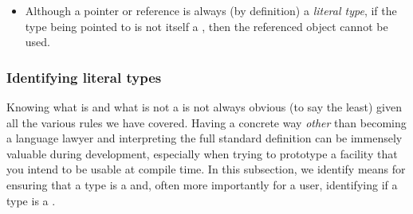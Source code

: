 \begin{itemize}
{\begin{emcppslisting}
static_assert(processByValue(Lt(7)) == 0, "");
    // Error, but OK (due to elided copy) on some platforms

constexpr Lt s{7};  // braced-initialized aggregate

static_assert(processByValue(s) == 0, "");  // Error, non(ù{}ù) copy ctor
\end{emcppslisting}
    

\noindent In the code example above, we have an \emph{aggregate} ,
\lstinline!Lt!, for which we have explicitly declared a
non\lstinline!constexpr! copy constructor. We then defined a valid
\lstinline!constexpr! function, \lstinline!processByValue!, taking an
\lstinline!Lt! (by value) as its only argument. Invoking the function by
constructing a object of \lstinline!Lt! from a literal \lstinline!int! value
enables the compiler to elide the copy.  Platforms where the copy is elided
might allow this evaluation at compile time, while on others there will be an error.
When we consider using an independently constructed \lstinline!constexpr! variable,
\lstinline!s!, the \lstinline!copy! can no longer be elided, and, since the
copy constructor is declared explicitly to be non\lstinline!constexpr!, the
compile-time assertion fails to compile on all platforms; see .}

\item{Although a pointer or reference is always (by definition) a \emph{literal type}, if the type being pointed to is not itself a , then the referenced object cannot be used.}
\end{itemize}

\subsubsection[Identifying literal types]{Identifying literal types}\label{identifying-literal-types}

Knowing what is and what is not a  is not always
obvious (to say the least) given all the various rules we have covered.
Having a concrete way \emph{other} than becoming a language lawyer and
interpreting the full standard definition can be immensely valuable
during development, especially when trying to prototype a facility that
you intend to be usable at compile time. In this subsection, we identify
means for ensuring that a type is a  and, often
more importantly for a user, identifying if a type is a
.

